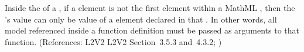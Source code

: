 Inside the  of a \FunctionDefinition, if a  element
is not the first element within a MathML , then the
's value can only be 
value of a  element declared in that .
In other words, all model  referenced
inside a function definition must be passed as arguments to that function.
(References: L2V2 L2V2 Section~3.5.3 and~4.3.2; )
